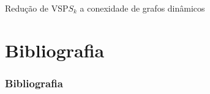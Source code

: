 \documentclass{IFES-beamer}
\begin{document}
\begin{frame}{Redução de VSP$S_k$ a conexidade de grafos dinâmicos}
\begin{figure}[htb]
\centering

\label{fig:LIM-convertido}
\end{figure}
\end{frame}




\section{Bibliografia}
\begin{frame}[allowframebreaks]
\frametitle{Bibliografia}

    
\end{frame}
\end{document}
